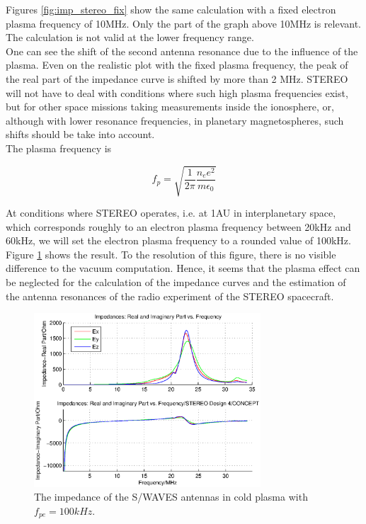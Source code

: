 \documentclass[draft,ras]{agutex}
\begin{document}
\begin{article}
Figures \ref{fig:imp_stereo_fix} show the same calculation with a fixed electron plasma frequency of 10MHz. Only the part of the graph above 10MHz is relevant. The calculation is not valid at the lower frequency range.\\

One can see the shift of the second antenna resonance due to the influence of the plasma. Even on the realistic plot with the fixed plasma frequency, the peak of the real part of the impedance curve is shifted by more than 2 MHz. STEREO will not have to deal with conditions where such high plasma frequencies exist, but for other space missions taking measurements inside the ionosphere, or, although with lower resonance frequencies, in planetary magnetospheres, such shifts should be take into account.\\

The plasma frequency is

\begin{equation}\label{Plasma frequency}
    f_p=\sqrt{\frac{1}{2\pi}{\frac{n_e e^2}{ m \epsilon_0}}}
\end{equation}

At conditions where STEREO operates, i.e. at 1AU in interplanetary space, which corresponds roughly to an electron plasma frequency between 20kHz and 60kHz, we will set the electron plasma frequency to a rounded value of 100kHz. Figure \ref{fig:imp_stereo_fix_100kHz} shows the result. To the resolution of this figure, there is no visible difference to the vacuum computation. Hence, it seems that the plasma effect can be neglected for the calculation of the impedance curves and the estimation of the antenna resonances of the radio experiment of the STEREO spacecraft.


\begin{figure}
\noindent\includegraphics[width=20pc]{impedance_stereo_pl_100khz.eps}
  \caption{The impedance of the S/WAVES antennas in cold plasma with $f_{pe}=100kHz$.}\label{fig:imp_stereo_fix_100kHz}
\end{figure}


\end{article}
\end{document}

